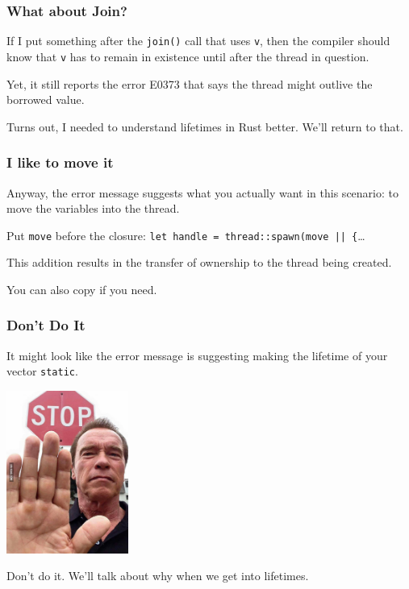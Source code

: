 \begin{frame}
\frametitle{What about Join?}

If I put something after the \texttt{join()} call that uses \texttt{v}, then the compiler should know that \texttt{v} has to remain in existence until after the thread in question. 

Yet, it still reports the error E0373 that says the thread might outlive the borrowed value. 

Turns out, I needed to understand \alert{lifetimes} in Rust better. We'll return to that.

\end{frame}


\begin{frame}
\frametitle{I like to move it}

Anyway, the error message suggests what you actually want in this scenario: to move the variables into the thread. 

Put \texttt{move} before the closure: \texttt{let handle = thread::spawn(move || \{}\ldots~ 

This addition results in the transfer of ownership to the thread being created. 

You can also copy if you need. 


\end{frame}


\begin{frame}
\frametitle{Don't Do It}

It might look like the error message is suggesting making the lifetime of your vector \texttt{static}.

\begin{center}
	\includegraphics[width=0.3\textwidth]{images/stop-arnold.jpg}
\end{center}

Don't do it. We'll talk about why when we get into lifetimes.

\end{frame}


